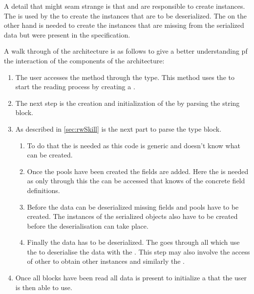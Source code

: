 \documentclass[thesis]{subfiles}
\begin{document}
  A detail that might seam strange is that \PoolProxy and \PoolMaker are responsible to create \UserFieldDeclarations instances.
  The \PartsMaker is used by the \Pool to create the \UserFieldDeclaration instances that are to be deserialized.
  The \PoolProxy on the other hand is needed to create the \UserFieldDeclaration instances that are missing from the serialized data but were present in the specification.


  A walk through of the architecture is as follows to give a better understanding pf the interaction of the components of the architecture:
  \begin{enumerate}
    \item
          The user accesses the \static \open method through the \SkillFile type.
          This method uses the \SkillFileBuilder to start the reading process by creating a \FileReader.
    \item
          The next step is the creation and initialization of the \StringPool by parsing the string block.
    \item
          As described in \autoref{sec:rwSkill} is the next part to parse the type block.
          \begin{enumerate}
            \item
                  To do that the \PoolMaker is needed as this code is generic and doesn't know what \UserTypePools can be created.
            \item
                  Once the pools have been created the fields are added.
                  Here the \PoolProxy \trait is needed as only through this \trait the \PartsMaker can be accessed that knows of the concrete field definitions.
            \item
                  Before the data can be deserialized missing fields and pools have to be created.
                  The instances of the serialized objects also have to be created before the deserialisation can take place.
            \item
                  Finally the data has to be deserialized.
                  The \SkillFileBuilder goes through all \UserTypePools which use the \FieldDeclarations to deserialise the data with the \FileReader.
                  This step may also involve the access of other \UserTypePools to obtain other \UserType instances and similarly the \StringPool.
          \end{enumerate}
    \item Once all blocks have been read all data is present to initialize a \SkillFile that the user is then able to use.
  \end{enumerate}
\end{document}
